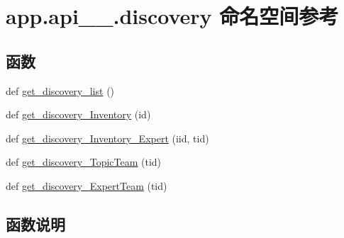 \hypertarget{namespaceapp_1_1api__1__0_1_1discovery}{}\section{app.\+api\+\_\+\_.\+discovery 命名空间参考}
\label{namespaceapp_1_1api__1__0_1_1discovery}
\subsection*{函数}
\begin{DoxyCompactItemize}
\item 
def \hyperlink{namespaceapp_1_1api__1__0_1_1discovery_a4f7c2da9cb8f1b3438511afbd624e9f6}{get\+\_\+discovery\+\_\+list} ()
\item 
def \hyperlink{namespaceapp_1_1api__1__0_1_1discovery_a045bba337777e4eae3ce1da1305b4564}{get\+\_\+discovery\+\_\+\+Inventory} (id)
\item 
def \hyperlink{namespaceapp_1_1api__1__0_1_1discovery_a92b592ac6747bde35ee3f16604abd4cf}{get\+\_\+discovery\+\_\+\+Inventory\+\_\+\+Expert} (iid, tid)
\item 
def \hyperlink{namespaceapp_1_1api__1__0_1_1discovery_a7f7dbb558f2e3c659d375959ba8bbcd2}{get\+\_\+discovery\+\_\+\+Topic\+Team} (tid)
\item 
def \hyperlink{namespaceapp_1_1api__1__0_1_1discovery_ac50b92e3ac84b3437eaf184c15818c3d}{get\+\_\+discovery\+\_\+\+Expert\+Team} (tid)
\end{DoxyCompactItemize}


\subsection{函数说明}
\hypertarget{namespaceapp_1_1api__1__0_1_1discovery_ac50b92e3ac84b3437eaf184c15818c3d}{}

